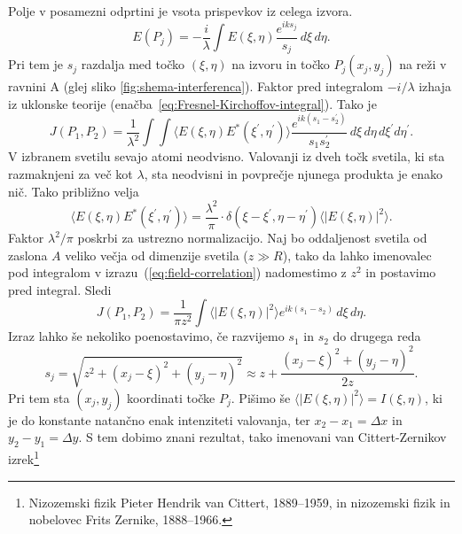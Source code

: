 Polje v posamezni odprtini je vsota prispevkov iz celega izvora.
\begin{equation}
E(P_{j})=-\frac{i}{\lambda}\int E(\xi,\eta)\frac{e^{iks_{j}}}{s_{j}}\, d\xi\, d\eta.
\end{equation}
Pri tem je $s_{j}$ razdalja med točko $(\xi,\eta)$ na izvoru in točko
$P_{j}(x_{j},y_{j})$ na reži v ravnini A (glej sliko \ref{fig:shema-interferenca}).
Faktor pred integralom $-i/\lambda$ izhaja iz uklonske teorije (enačba~\ref{eq:Fresnel-Kirchoffov-integral}).
Tako je 
\begin{equation}
J(P_{1},P_{2})=\frac{1}{\lambda^{2}}\int\int\langle E(\xi,\eta)E^{*}(\xi^{\prime},\eta^{\prime})\rangle\frac{e^{ik(s_{1}-s_{2}^{\prime})}}{s_{1}s_{2}^{\prime}}\, d\xi\, d\eta\, d\xi^{\prime}d\eta^{\prime}.\label{eq:field-correlation}
\end{equation}
V izbranem svetilu sevajo atomi neodvisno. Valovanji iz dveh točk svetila,
ki sta razmaknjeni za več kot $\lambda$, sta neodvisni in povprečje
njunega produkta je enako nič. Tako približno velja 
\begin{equation}
\langle E(\xi,\eta)E^{*}(\xi^{\prime},\eta^{\prime})\rangle=\frac{\lambda^{2}}{\pi} \cdot \delta(\xi-\xi^{\prime},\eta-\eta^{\prime})\langle|E(\xi,\eta)|^{2}\rangle.
\label{eq:delta-Zernike}
\end{equation}
Faktor $\lambda^{2}/\pi$ poskrbi za ustrezno normalizacijo. 
Naj bo oddaljenost svetila od zaslona $A$
veliko večja od dimenzije svetila ($z\gg R$), tako da lahko imenovalec pod integralom
v izrazu~(\ref{eq:field-correlation}) nadomestimo z $z^{2}$ in postavimo
pred integral. Sledi
\begin{equation}
J(P_{1},P_{2})=\frac{1}{\pi z^{2}}\int\langle|E(\xi,\eta)|^{2}\rangle e^{ik(s_{1}-s_{2})}\, d\xi\, d\eta.\label{eq:Zernike1}
\end{equation}
Izraz lahko še nekoliko poenostavimo, če razvijemo $s_{1}$
in $s_{2}$ do drugega reda
\begin{equation}
s_{j}=\sqrt{z^{2}+(x_{j}-\xi)^{2}+(y_{j}-\eta)^{2}}\approx z+\frac{(x_{j}-\xi)^{2}+(y_{j}-\eta)^{2}}{2z}.
\end{equation}
Pri tem sta $(x_{j},y_{j})$ koordinati točke $P_{j}$. Pišimo 
še $\langle|E(\xi,\eta)|^{2}\rangle=I(\xi,\eta)$, ki je do konstante natančno
enak intenziteti valovanja, ter $x_{2}-x_{1}=\Delta x$
in $y_{2}-y_{1}=\Delta y$. S tem dobimo znani rezultat, tako imenovani 
van Cittert-Zernikov izrek\footnote{Nizozemski fizik Pieter Hendrik van Cittert, 1889--1959, in 
nizozemski fizik in nobelovec Frits Zernike, 1888--1966.}

